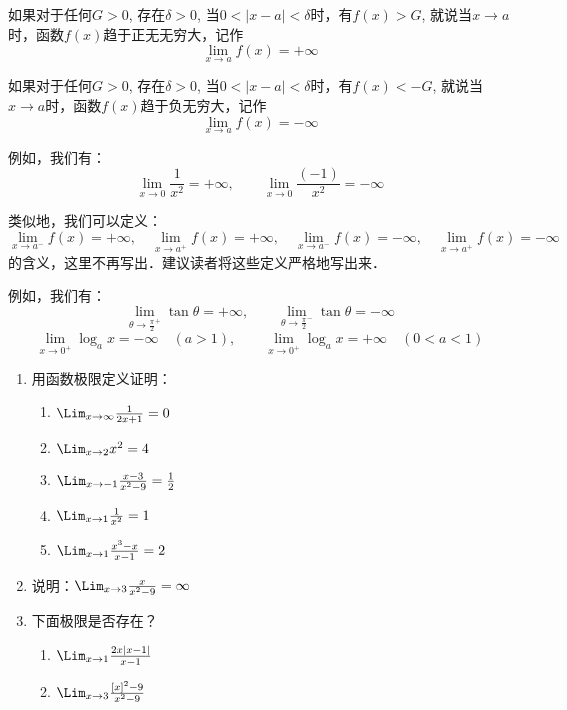 如果对于任何$G>0$, 存在$\delta>0$, 当$0<|x-a|<\delta$时，有$f(x)>G$, 就说当$x\to a$时，函数$f(x)$趋于正无无穷大，记作
\[\lim_{x\to a}f(x)=+\infty\]

如果对于任何$G>0$, 存在$\delta>0$, 当$0<|x-a|<\delta$时，有$f(x)<-G$, 就说当$x\to a$时，函数$f(x)$趋于负无穷大，记作
\[\lim_{x\to a}f(x)=-\infty\]

例如，我们有：
\[\lim_{x\to 0}\frac{1}{x^2}=+\infty,\qquad \lim_{x\to 0}\frac{(-1)}{x^2}=-\infty\]

类似地，我们可以定义：
\[\lim_{x\to a^-}f(x)=+\infty,\quad \lim_{x\to a^+}f(x)=+\infty,\quad \lim_{x\to a^-}f(x)=-\infty,\quad \lim_{x\to a^+}f(x)=-\infty\]
的含义，这里不再写出．建议读者将这些定义严格地写出来．

例如，我们有：
\[\lim_{\theta\to \tfrac{\pi}{2}^+}\tan\theta =+\infty,\qquad \lim_{\theta\to \tfrac{\pi}{2}^-}\tan\theta =-\infty\]
\[\lim_{x\to 0^+}\log_a x =-\infty\quad (a>1),\qquad \lim_{x\to 0^+}\log_a x =+\infty\quad (0<a<1)\]

\begin{ex}
\begin{enumerate}
    \item 用函数极限定义证明：
    \begin{multicols}{2}
        \begin{enumerate}
            \item $\Lim_{x\to \infty}\frac{1}{2x+1}=0$
            \item $\Lim_{x\to 2}x^2=4$
            \item $\Lim_{x\to -1}\frac{x-3}{x^2-9}=\frac{1}{2}$
            \item $\Lim_{x\to 1}\frac{1}{x^2}=1$
            \item $\Lim_{x\to 1}\frac{x^3-x}{x-1}=2$
        \end{enumerate}
    \end{multicols}
    \item 说明：$\Lim_{x\to 3}\frac{x}{x^2-9}=\infty$
    \item 下面极限是否存在？
\begin{multicols}{2}
    \begin{enumerate}
        \item $\Lim_{x\to 1}\frac{2x|x-1|}{x-1}$
        \item $\Lim_{x\to 3}\frac{[x]^2-9}{x^2-9}$
    \end{enumerate}
\end{multicols}
\end{enumerate}
\end{ex}

